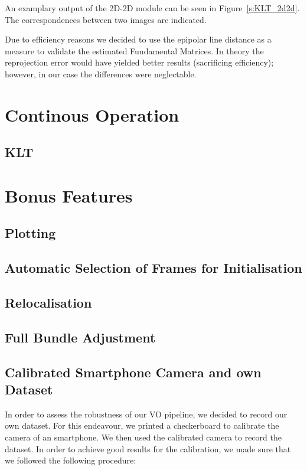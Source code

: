 An examplary output of the 2D-2D module can be seen in Figure~\ref{s:KLT_2d2d}. The correspondences between two images are indicated.

Due to efficiency reasons we decided to use the epipolar line distance as a measure to validate the estimated Fundamental Matrices. In theory the reprojection error would have yielded better results (sacrificing efficiency); however, in our case the differences were neglectable.

\section{Continous Operation}
\label{s:ContOp}

\subsection{KLT}

\section{Bonus Features}
\label{s:BF}

\subsection{Plotting}


\subsection{Automatic Selection of Frames for Initialisation}

\subsection{Relocalisation}

\subsection{Full Bundle Adjustment}

\subsection{Calibrated Smartphone Camera and own Dataset}

In order to assess the robustness of our VO pipeline, we decided to record our own dataset.
For this endeavour, we printed a checkerboard to calibrate the camera of an smartphone.
We then used the calibrated camera to record the dataset.
In order to achieve good results for the calibration, we made sure that we followed the following procedure:

